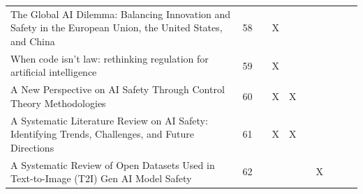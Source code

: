 \begin{landscape}
\begin{longtable}{|p{14cm}|c|c|c|c|c|c|c|c|c|}
		The Global AI Dilemma: Balancing Innovation and Safety in the European Union, the United States, and China                                              & 58          &                                    & X                                                         &                                                       &                                                            &                                           &                                              &                                                    &                                    \\
		When code isn't law: rethinking regulation for artificial intelligence                                                                                  & 59          &                                    & X                                                         &                                                       &                                                            &                                           &                                              &                                                    &                                    \\
		A New Perspective on AI Safety Through Control Theory Methodologies                                                                                     & 60          &                                    & X                                                         & X                                                     &                                                            &                                           &                                              &                                                    &                                    \\
		A Systematic Literature Review on AI Safety: Identifying Trends, Challenges, and Future Directions                                                      & 61          &                                    & X                                                         & X                                                     &                                                            &                                           &                                              &                                                    &                                    \\
		A Systematic Review of Open Datasets Used in Text-to-Image (T2I) Gen AI Model Safety                                                                    & 62          &                                    &                                                           &                                                       &                                                            & X                                         &                                              &                                                    &                                    \\

\end{longtable}
\end{landscape}
